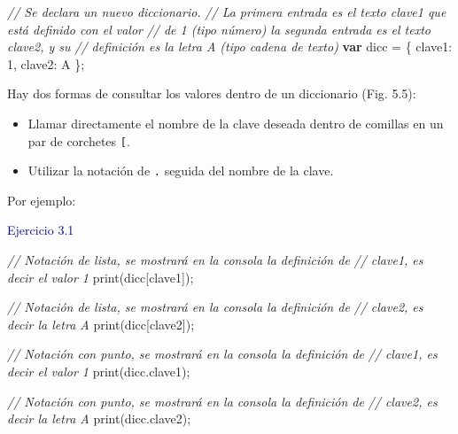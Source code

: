 \documentclass[
  12pt,
  letterpaper,
  twoside]{book}
\newenvironment{Shaded}{\begin{snugshade}}{\end{snugshade}}
\newcommand{\AttributeTok}[1]{\textcolor[rgb]{0.48,0.12,0.64}{#1}}
\newcommand{\CommentTok}[1]{\textcolor[rgb]{0.24,0.58,0.00}{\textit{#1}}}
\newcommand{\DataTypeTok}[1]{\textcolor[rgb]{0.00,0.00,0.00}{#1}}
\newcommand{\DecValTok}[1]{\textcolor[rgb]{0.28,0.53,0.93}{#1}}
\newcommand{\FunctionTok}[1]{\textcolor[rgb]{0.48,0.12,0.64}{#1}}
\newcommand{\KeywordTok}[1]{\textcolor[rgb]{0.00,0.00,0.00}{\textbf{#1}}}
\newcommand{\NormalTok}[1]{#1}
\newcommand{\OperatorTok}[1]{\textcolor[rgb]{0.00,0.00,0.00}{#1}}
\newcommand{\StringTok}[1]{\textcolor[rgb]{0.87,0.29,0.22}{#1}}
\providecommand{\tightlist}{%
  \setlength{\itemsep}{0pt}\setlength{\parskip}{0pt}}
\begin{document}
\begin{Shaded}
\begin{Highlighting}[]
\CommentTok{// Se declara un nuevo diccionario.}
\CommentTok{// La primera entrada es el texto \textquotesingle{}clave1\textquotesingle{} que está definido con el valor}
\CommentTok{// de 1 (tipo número) la segunda entrada es el texto \textquotesingle{}clave2\textquotesingle{}, y su }
\CommentTok{// definición es la letra \textquotesingle{}A\textquotesingle{} (tipo cadena de texto)}
\KeywordTok{var}\NormalTok{ dicc }\OperatorTok{=}\NormalTok{ \{   }
  \DataTypeTok{clave1}\OperatorTok{:} \DecValTok{1}\OperatorTok{,}      
  \DataTypeTok{clave2}\OperatorTok{:} \StringTok{\textquotesingle{}A\textquotesingle{}}  
\NormalTok{\}}\OperatorTok{;}            
      
\end{Highlighting}
\end{Shaded}

Hay dos formas de consultar los valores dentro de un diccionario (Fig. 5.5):

\begin{itemize}
\tightlist
\item
  Llamar directamente el nombre de la clave deseada dentro de comillas en un par de corchetes \texttt{{[}\textquotesingle{}\textquotesingle{}{]}}.
\item
  Utilizar la notación de \texttt{.} seguida del nombre de la clave.
\end{itemize}

Por ejemplo:

\textcolor{darkblue}{Ejercicio 3.1}

\begin{Shaded}
\begin{Highlighting}[]
\CommentTok{// Notación de lista, se mostrará en la consola la definición de }
\CommentTok{// \textquotesingle{}clave1\textquotesingle{}, es decir el valor 1 }
\FunctionTok{print}\NormalTok{(dicc[}\StringTok{\textquotesingle{}clave1\textquotesingle{}}\NormalTok{])}\OperatorTok{;} 

\CommentTok{// Notación de lista, se mostrará en la consola la definición de }
\CommentTok{// \textquotesingle{}clave2\textquotesingle{}, es decir la letra \textquotesingle{}A\textquotesingle{}}
\FunctionTok{print}\NormalTok{(dicc[}\StringTok{\textquotesingle{}clave2\textquotesingle{}}\NormalTok{])}\OperatorTok{;}  

\CommentTok{// Notación con punto, se mostrará en la consola la definición de }
\CommentTok{// \textquotesingle{}clave1\textquotesingle{}, es decir el valor 1 }
\FunctionTok{print}\NormalTok{(dicc}\OperatorTok{.}\AttributeTok{clave1}\NormalTok{)}\OperatorTok{;}  

\CommentTok{// Notación con punto, se mostrará en la consola la definición de }
\CommentTok{// \textquotesingle{}clave2\textquotesingle{}, es decir la letra \textquotesingle{}A\textquotesingle{}}
\FunctionTok{print}\NormalTok{(dicc}\OperatorTok{.}\AttributeTok{clave2}\NormalTok{)}\OperatorTok{;}  
\end{Highlighting}
\end{Shaded}
\end{document}
